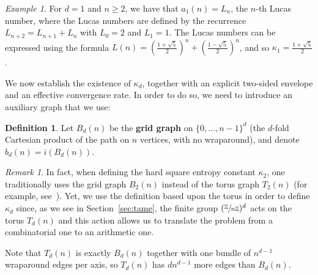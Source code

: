 \documentclass{article}
\theoremstyle{plain}
\theoremstyle{definition}
\newtheorem{definition}[theorem]{Definition}
\theoremstyle{remark}
\newtheorem{example}[theorem]{Example}
\newtheorem{remark}[theorem]{Remark}
\newcommand{\Z}{\mathbb{Z}}
\begin{document}
\begin{example}\label{ex:lucas}
For $d=1$ and $n \geq 2$, we have that $a_1(n)=L_n$, the $n$-th Lucas number, where the Lucas numbers are defined by the recurrence $L_{n+2}=L_{n+1}+L_n$ with $L_0=2$ and $L_1=1$. The Lucas numbers can be expressed using the formula $L(n) = (\frac{1+\sqrt{5}}{2})^{n}+(\frac{1-\sqrt{5}}{2})^n$, and so $\kappa_1=\frac{1+\sqrt{5}}{2}$.
\end{example}

We now establish the existence of $\kappa_d$, together with an explicit two-sided envelope and an effective convergence rate. In order to do so, we need to introduce an auxiliary graph that we use:

\begin{definition}
    Let $B_d(n)$ be the \textbf{grid graph} on $\{0,\dots,n-1\}^d$ (the $d$-fold Cartesian product of the path on $n$ vertices, with no wraparound), and denote $b_d(n)=i(B_d(n))$.
\end{definition}

\begin{remark}
    In fact, when defining the hard square entropy constant $\kappa_2$, one traditionally uses the grid graph $B_2(n)$ instead of the torus graph $T_2(n)$ (for example, see~\cite{BaxterBook1982}). Yet,  we use the definition based upon the torus in order to define $\kappa_d$ since, as we see in Section~\ref{sec:tame}, the finite group $(\sfrac{\Z}{n\Z})^d$ acts on the torus $T_d(n)$ and this action allows us to translate the problem from a combinatorial one to an arithmetic one.   
\end{remark}

 Note that $T_d(n)$ is exactly $B_d(n)$ together with one bundle of $n^{d-1}$ wraparound edges per axis, so $T_d(n)$ has $dn^{d-1}$ more edges than $B_d(n)$.
\end{document}
